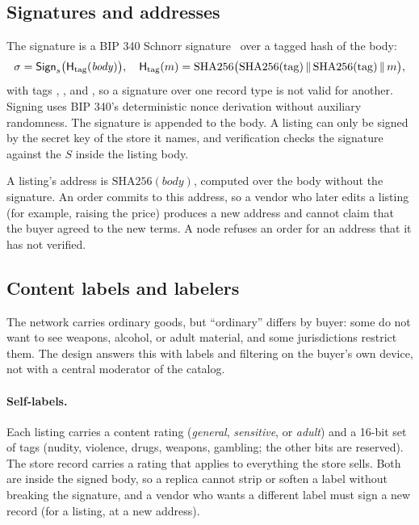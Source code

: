 \subsection{Signatures and addresses}

The signature is a BIP 340 Schnorr signature~\citep{bip340} over a tagged hash of the body:
\[
  \sigma = \mathsf{Sign}_{s}\bigl(\mathsf{H}_{\mathrm{tag}}(\mathit{body})\bigr),\quad \mathsf{H}_{\mathrm{tag}}(m)=\mathrm{SHA256}\bigl(\mathrm{SHA256}(\mathrm{tag})\,\|\,\mathrm{SHA256}(\mathrm{tag})\,\|\,m\bigr),
\]
with tags , , and , so a signature over one record type is not valid for another. Signing uses BIP 340's deterministic nonce derivation without auxiliary randomness. The signature is appended to the body. A listing can only be signed by the secret key of the store it names, and verification checks the signature against the $S$ inside the listing body.

A listing's address is $\mathrm{SHA256}(\mathit{body})$, computed over the body without the signature. An order commits to this address, so a vendor who later edits a listing (for example, raising the price) produces a new address and cannot claim that the buyer agreed to the new terms. A node refuses an order for an address that it has not verified.

\subsection{Content labels and labelers}
\label{sec:labels}

The network carries ordinary goods, but ``ordinary'' differs by buyer: some do not want to see weapons, alcohol, or adult material, and some jurisdictions restrict them. The design answers this with labels and filtering on the buyer's own device, not with a central moderator of the catalog.

\paragraph{Self-labels.} Each listing carries a content rating (\emph{general}, \emph{sensitive}, or \emph{adult}) and a 16-bit set of tags (nudity, violence, drugs, weapons, gambling; the other bits are reserved). The store record carries a rating that applies to everything the store sells. Both are inside the signed body, so a replica cannot strip or soften a label without breaking the signature, and a vendor who wants a different label must sign a new record (for a listing, at a new address).

